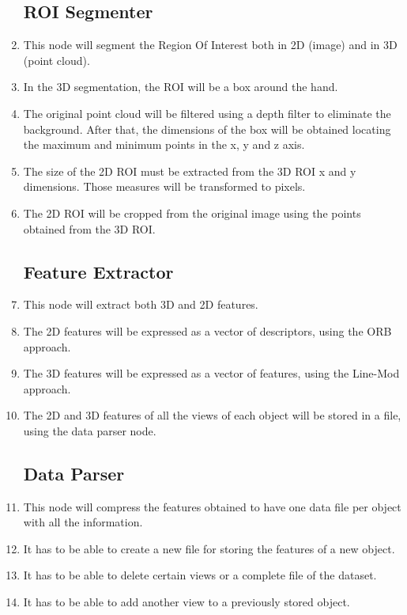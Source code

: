 \documentclass{article}
\makeatletter
\def\threedigits#1{\expandafter\@threedigits\csname c@#1\endcsname}
\def\@threedigits#1{%
  \ifnum#1<100 0\fi
  \ifnum#1<10 0\fi
  \number#1}
\makeatother
\begin{document}
\begin{enumerate}[label=\textbf{FR\threedigits*}, leftmargin=2cm]
\subsection{ROI Segmenter}
	\item This node will segment the Region Of Interest both in 2D (image) and in 3D (point cloud). 
	\item In the 3D segmentation, the ROI will be a box around the hand. 
	\item The original point cloud will be filtered using a depth filter to eliminate the background. After that, the dimensions of the box will be obtained locating the maximum and minimum points in the x, y and z axis. 
	\item The size of the 2D ROI must be extracted from the 3D ROI x and y dimensions. Those measures will be transformed to pixels. 
	\item The 2D ROI will be cropped from the original image using the points obtained from the 3D ROI. 

\subsection{Feature Extractor}
\item This node will extract both 3D and 2D features. 
\item The 2D features will be expressed as a vector of descriptors, using the ORB approach. 
\item The 3D features will be expressed as a vector of features, using the Line-Mod approach.

\item The 2D and 3D features of all the views of each object will be stored in a file, using the data parser node.  

\subsection{Data Parser}
\item This node will compress the features obtained to have one data file per object with all the information.
 
\item It has to be able to create a new file for storing the features of a new object. 
\item It has to be able to delete certain views or a complete file of the dataset. 
\item It has to be able to add another view to a previously stored object. 


\end{enumerate}
\end{document}
